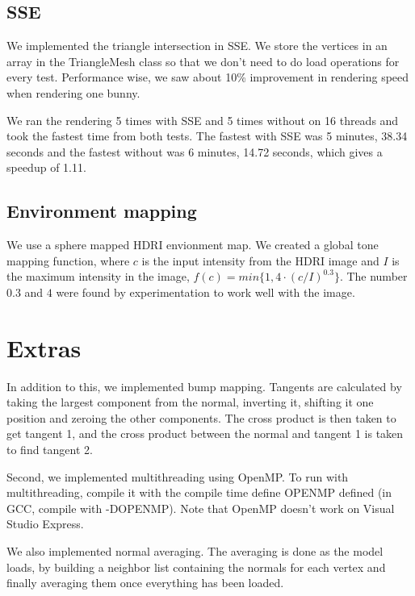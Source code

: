 \documentclass{article} %
\begin{document}
\subsection{SSE}
We implemented the triangle intersection in SSE. We store the vertices in an array in the TriangleMesh class so that we don't need to do load operations for every test. Performance wise, we saw about 10\% improvement in rendering speed when rendering one bunny. 

We ran the rendering 5 times with SSE and 5 times without on 16 threads and took the fastest time from both tests. The fastest with SSE was 5 minutes, 38.34 seconds and the fastest without was 6 minutes, 14.72 seconds, which gives a speedup of 1.11.

\subsection{Environment mapping}
We use a sphere mapped HDRI envionment map. We created a global tone mapping function, where $c$ is the input intensity from the HDRI image and $I$ is the maximum intensity in the image, $f(c)=min\{1, 4\cdot(c/I)^{0.3}\}$. The number $0.3$ and $4$ were found by experimentation to work well with the image.

\section{Extras}
In addition to this, we implemented bump mapping. Tangents are calculated by taking the largest component from the normal, inverting it, shifting it one position and zeroing the other components. The cross product is then taken to get tangent 1, and the cross product between the normal and tangent 1 is taken to find tangent 2.

Second, we implemented multithreading using OpenMP. To run with multithreading, compile it with the compile time define OPENMP defined (in GCC, compile with -DOPENMP). Note that OpenMP doesn't work on Visual Studio Express.

We also implemented normal averaging. The averaging is done as the model loads, by building a neighbor list containing the normals for each vertex and finally averaging them once everything has been loaded.
\end{document}
